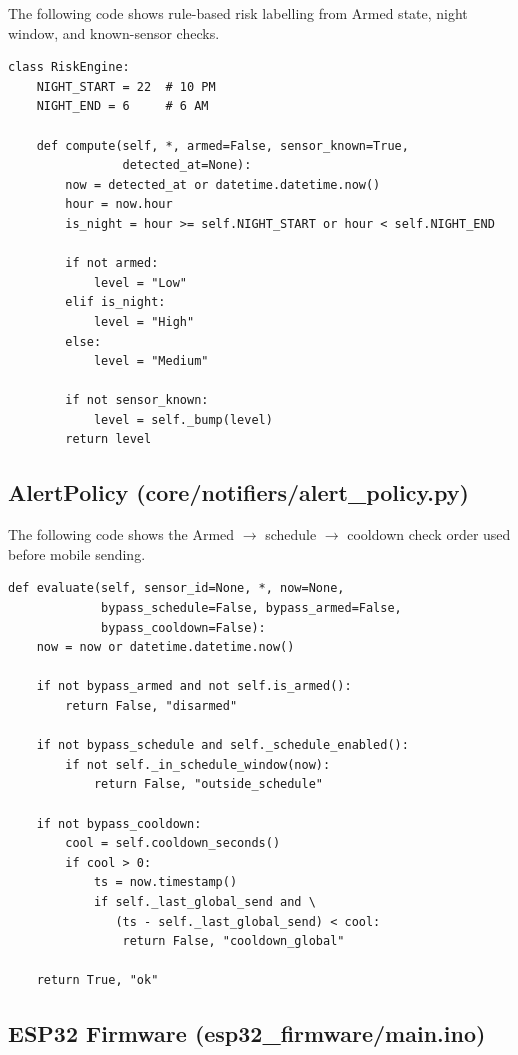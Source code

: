\documentclass[12pt,a4paper]{report}
\begin{document}
The following code shows rule-based risk labelling from Armed state, night window, and known-sensor checks.

\begin{verbatim}
class RiskEngine:
    NIGHT_START = 22  # 10 PM
    NIGHT_END = 6     # 6 AM

    def compute(self, *, armed=False, sensor_known=True,
                detected_at=None):
        now = detected_at or datetime.datetime.now()
        hour = now.hour
        is_night = hour >= self.NIGHT_START or hour < self.NIGHT_END

        if not armed:
            level = "Low"
        elif is_night:
            level = "High"
        else:
            level = "Medium"

        if not sensor_known:
            level = self._bump(level)
        return level
\end{verbatim}

\subsection*{AlertPolicy (core/notifiers/alert\_policy.py)}

The following code shows the Armed $\rightarrow$ schedule $\rightarrow$ cooldown check order used before mobile sending.

\begin{verbatim}
def evaluate(self, sensor_id=None, *, now=None,
             bypass_schedule=False, bypass_armed=False,
             bypass_cooldown=False):
    now = now or datetime.datetime.now()

    if not bypass_armed and not self.is_armed():
        return False, "disarmed"

    if not bypass_schedule and self._schedule_enabled():
        if not self._in_schedule_window(now):
            return False, "outside_schedule"

    if not bypass_cooldown:
        cool = self.cooldown_seconds()
        if cool > 0:
            ts = now.timestamp()
            if self._last_global_send and \
               (ts - self._last_global_send) < cool:
                return False, "cooldown_global"

    return True, "ok"
\end{verbatim}

\subsection*{ESP32 Firmware (esp32\_firmware/main.ino)}
\end{document}
